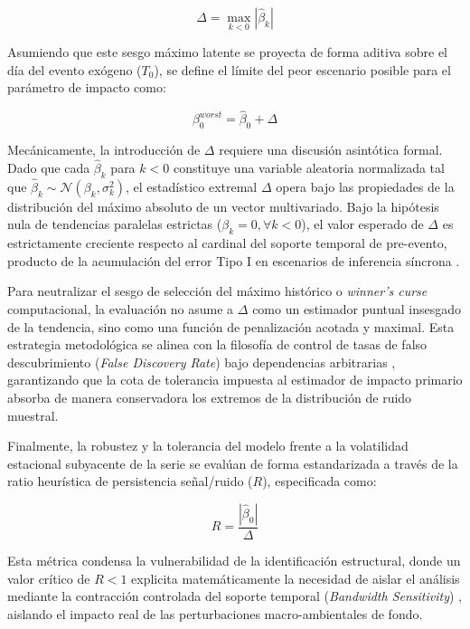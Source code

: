 \begin{equation}
    \Delta = \max_{k < 0} \left| \hat{\beta}_k \right|
\end{equation}

Asumiendo que este sesgo m\'aximo latente se proyecta de forma aditiva sobre el d\'ia del evento ex\'ogeno ($T_0$), se define el l\'imite del peor escenario posible para el par\'ametro de impacto como:

\begin{equation}
    \beta_0^{worst} = \hat{\beta}_0 + \Delta
\end{equation}

Mec\'anicamente, la introducci\'on de $\Delta$ requiere una discusi\'on asint\'otica formal. Dado que cada $\hat{\beta}_k$ para $k < 0$ constituye una variable aleatoria normalizada tal que $\hat{\beta}_k \sim \mathcal{N}(\beta_k, \sigma_k^2)$, el estad\'istico extremal $\Delta$ opera bajo las propiedades de la distribuci\'on del m\'aximo absoluto de un vector multivariado. Bajo la hip\'otesis nula de tendencias paralelas estrictas ($\beta_k = 0, \forall k < 0$), el valor esperado de $\Delta$ es estrictamente creciente respecto al cardinal del soporte temporal de pre-evento, producto de la acumulaci\'on del error Tipo I en escenarios de inferencia s\'incrona \citep{rambachan2023credible}. 

Para neutralizar el sesgo de selecci\'on del m\'aximo hist\'orico o \textit{winner's curse} computacional, la evaluaci\'on no asume a $\Delta$ como un estimador puntual insesgado de la tendencia, sino como una funci\'on de penalizaci\'on acotada y maximal. Esta estrategia metodol\'ogica se alinea con la filosof\'ia de control de tasas de falso descubrimiento (\textit{False Discovery Rate}) bajo dependencias arbitrarias \citep{benjamini1995}, garantizando que la cota de tolerancia impuesta al estimador de impacto primario absorba de manera conservadora los extremos de la distribuci\'on de ruido muestral.

Finalmente, la robustez y la tolerancia del modelo frente a la volatilidad estacional subyacente de la serie se eval\'uan de forma estandarizada a trav\'es de la ratio heur\'istica de persistencia se\~nal/ruido ($R$), especificada como:

\begin{equation}
    R = \frac{\left| \hat{\beta}_0 \right|}{\Delta}
\end{equation}

Esta m\'etrica condensa la vulnerabilidad de la identificaci\'on estructural, donde un valor cr\'itico de $R < 1$ explicita matem\'aticamente la necesidad de aislar el an\'alisis mediante la contracci\'on controlada del soporte temporal (\textit{Bandwidth Sensitivity}) \citep{baker2026difference}, aislando el impacto real de las perturbaciones macro-ambientales de fondo.

